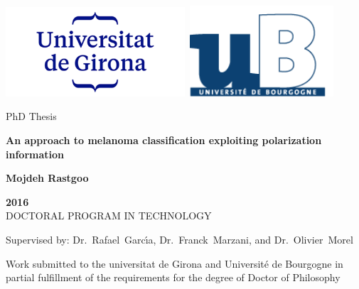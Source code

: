 
\newpage
\thispagestyle{empty}

\vspace{3cm}
\begin{center}
\includegraphics[width=0.5\textwidth]{Figures/logo/udglogo2.png}\
\includegraphics[width= 0.4\textwidth]{Figures/logo/logoub.png}
\end{center}
\vspace{0.3cm}
\begin{center}
PhD Thesis
\end{center}
\vspace{0.5cm}
\begin{center}
\LARGE{\LARGE{\textbf{An approach to melanoma classification exploiting polarization information
}}}
\end{center}
\vspace{0.5cm}
\begin{center}
{\large{\textbf{Mojdeh Rastgoo}}}
\end{center}
\vspace{1.5cm}
\begin{center}
\textbf{2016}\\
DOCTORAL PROGRAM IN TECHNOLOGY
\end{center}
\vspace{0.001cm}
\begin{center}
Supervised by: Dr.~Rafael~Garc\'{\i}a, Dr.~Franck~Marzani, and Dr.~Olivier~Morel
\end{center}
\vspace{2.5cm}
\begin{center}
Work submitted to the universitat de Girona and Universit\'e de Bourgogne in partial fulfillment of the requirements for the degree of Doctor of Philosophy
\end{center}



